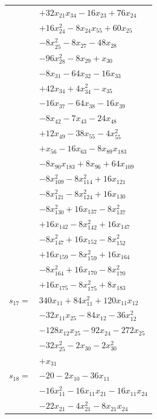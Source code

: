 \begin{longtable}{@{}r@{\;}l@{}}
 & \(\displaystyle +32x_{21}x_{34} -16x_{23} +76x_{24}\) \\
 & \(\displaystyle +16x_{24}^{2} -8x_{24}x_{55} +60x_{25}\) \\
 & \(\displaystyle -8x_{25}^{2} -8x_{27} -48x_{28}\) \\
 & \(\displaystyle -96x_{28}^{2} -8x_{29} +x_{30}\) \\
 & \(\displaystyle -8x_{31} -64x_{32} -16x_{33}\) \\
 & \(\displaystyle +42x_{34} +4x_{34}^{2} -x_{35}\) \\
 & \(\displaystyle -16x_{37} -64x_{38} -16x_{39}\) \\
 & \(\displaystyle -8x_{42} -7x_{43} -24x_{48}\) \\
 & \(\displaystyle +12x_{49} -38x_{55} -4x_{55}^{2}\) \\
 & \(\displaystyle +x_{56} -16x_{63} -8x_{89}x_{183}\) \\
 & \(\displaystyle -8x_{90}x_{183} +8x_{96} +64x_{109}\) \\
 & \(\displaystyle -8x_{109}^{2} -8x_{114}^{2} +16x_{121}\) \\
 & \(\displaystyle -8x_{121}^{2} -8x_{124}^{2} +16x_{130}\) \\
 & \(\displaystyle -8x_{130}^{2} +16x_{137} -8x_{137}^{2}\) \\
 & \(\displaystyle +16x_{142} -8x_{142}^{2} +16x_{147}\) \\
 & \(\displaystyle -8x_{147}^{2} +16x_{152} -8x_{152}^{2}\) \\
 & \(\displaystyle +16x_{159} -8x_{159}^{2} +16x_{164}\) \\
 & \(\displaystyle -8x_{164}^{2} +16x_{170} -8x_{170}^{2}\) \\
 & \(\displaystyle +16x_{175} -8x_{175}^{2} +8x_{183}\) \\[3pt]
\(s_{17}=\) & \(\displaystyle 340x_{11} +84x_{11}^{2} +120x_{11}x_{12}\) \\
 & \(\displaystyle -32x_{11}x_{25} -84x_{12} -36x_{12}^{2}\) \\
 & \(\displaystyle -128x_{12}x_{25} -92x_{24} -272x_{25}\) \\
 & \(\displaystyle -32x_{25}^{2} -2x_{30} -2x_{30}^{2}\) \\
 & \(\displaystyle +x_{31}\) \\[3pt]
\(s_{18}=\) & \(\displaystyle -20 -2x_{10} -36x_{11}\) \\
 & \(\displaystyle -16x_{11}^{2} -16x_{11}x_{21} -16x_{11}x_{24}\) \\
 & \(\displaystyle -22x_{21} -4x_{21}^{2} -8x_{21}x_{24}\) \\

\end{longtable}
